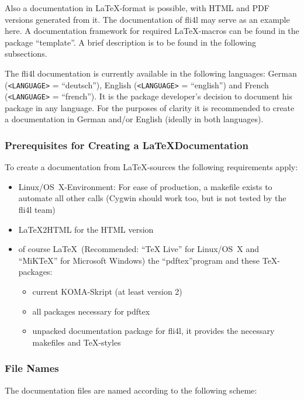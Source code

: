     Also a documentation in \LaTeX-format is possible, with HTML and
    PDF versions generated from it. The documentation of fli4l may serve as an example
    here. A documentation framework for required \LaTeX-macros can be found in
    the package ``template''. A brief description is to be found in the
    following subsections.

    The fli4l documentation is currently available in the following languages:
    German (\texttt{<LANGUAGE>} = ``deutsch''), English (\texttt{<LANGUAGE>} = ``english'') and
    French (\texttt{<LANGUAGE>} = ``french''). It is the package developer's
    decision to document his package in any language. For the purposes of
    clarity it is recommended to create a documentation in German and/or
    English (ideally in both languages).

\subsubsection{Prerequisites for Creating a \LaTeX Documentation}

  To create a documentation from \LaTeX-sources the following
  requirements apply:

  \begin{itemize}
  \item Linux/OS~X-Environment: For ease of production, a makefile
    exists to automate all other calls (Cygwin should work too, but
    is not tested by the fli4l team)
  \item LaTeX2HTML for the HTML version
  \item of course \LaTeX\ (Recommended: ``TeX Live'' for Linux/OS~X and
  ``MiKTeX'' for Microsoft Windows)  the ``pdftex''program and these
    \TeX-packages:
    \begin{itemize}
    \item current KOMA-Skript (at least version 2)
    \item all packages necessary for pdftex
    \item unpacked documentation package for fli4l, it provides the
      necessary makefiles and \TeX-styles
  \end{itemize}
  \end{itemize}


\subsubsection{File Names}

The documentation files are named according to the following scheme:

